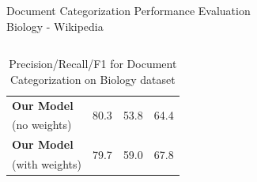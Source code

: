 \documentclass[10pt]{beamer}
\begin{document}
\begin{frame}{Document Categorization Performance Evaluation \\ Biology - Wikipedia }
\begin{columns}[T]
\begin{column}{.4\textwidth}
\begin{table}[h!]
\begin{center}
\begin{tabular}{l@{\hskip5mm} c c@{\hskip4mm} c}
		\textbf{Our Model}
		& \multirow{2}{*}{80.3}   & \multirow{2}{*}{53.8}  & \multirow{2}{*}{64.4} \\
		(no weights) & & & \\ \addlinespace[1mm]
		\textbf{Our Model}
		& \multirow{2}{*}{79.7}   & \multirow{2}{*}{59.0}  & \multirow{2}{*}{67.8} \\
		(with weights) & & & \\
		\bottomrule         
		\end{tabular}
		\caption*{\footnotesize Precision/Recall/F1 for Document Categorization on Biology dataset}
		\end{center}
		\end{table}
	\end{column}
\end{columns}

\end{frame}
\end{document}
